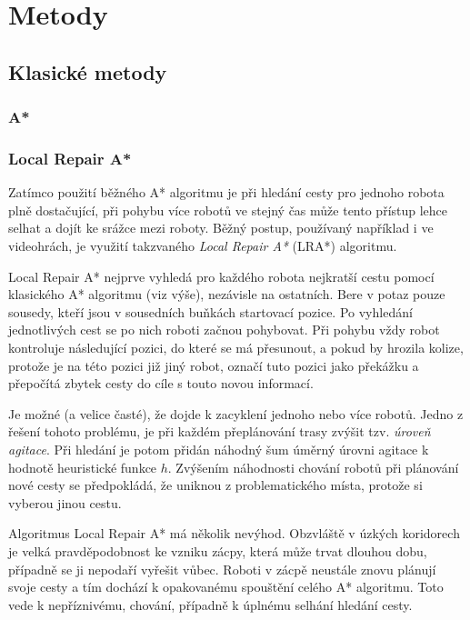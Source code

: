 \chapter{Metody}
\section{Klasické metody}
\subsection{A*}
\subsection{Local Repair A*}
Zatímco použití běžného A* algoritmu je při hledání cesty pro jednoho robota plně dostačující, při pohybu více robotů ve stejný čas může tento přístup lehce selhat a dojít ke srážce mezi roboty. Běžný postup, používaný například i ve videohrách, je využití takzvaného \emph{Local Repair A*} (LRA*) algoritmu.

Local Repair A* nejprve vyhledá pro každého robota nejkratší cestu pomocí klasického A* algoritmu (viz výše), nezávisle na ostatních. Bere v potaz pouze sousedy, kteří jsou v sousedních buňkách startovací pozice. Po vyhledání jednotlivých cest se po nich roboti začnou pohybovat. Při pohybu vždy robot kontroluje následující pozici, do které se má přesunout, a pokud by hrozila kolize, protože je na této pozici již jiný robot, označí tuto pozici jako překážku a přepočítá zbytek cesty do cíle s touto novou informací.


Je možné (a velice časté), že dojde k zacyklení jednoho nebo více robotů. Jedno z řešení tohoto problému, je při každém přeplánování trasy zvýšit tzv. \emph{úroveň agitace}. Při hledání je potom přidán náhodný šum úměrný úrovni agitace k hodnotě heuristické funkce $h$. Zvýšením náhodnosti chování robotů při plánování nové cesty se předpokládá, že uniknou z problematického místa, protože si vyberou jinou cestu.

Algoritmus Local Repair A* má několik nevýhod. Obzvláště v úzkých koridorech je velká pravděpodobnost ke vzniku zácpy, která může trvat dlouhou dobu, případně se ji nepodaří vyřešit vůbec. Roboti v zácpě neustále znovu plánují svoje cesty a tím dochází k opakovanému spouštění celého A* algoritmu. Toto vede k nepříznivému,  chování, případně k úplnému selhání hledání cesty.



